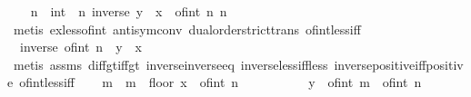 \begin{isabellebody}
\ \ \isamarkupfalse%
\ n\ {\isacharcolon}{\kern0pt}{\isacharcolon}{\kern0pt}\ int\ \ n{\isacharcolon}{\kern0pt}\ {\isachardoublequoteopen}inverse\ {\isacharparenleft}{\kern0pt}y\ {\isacharminus}{\kern0pt}\ x{\isacharparenright}{\kern0pt}\ {\isacharless}{\kern0pt}\ of{\isacharunderscore}{\kern0pt}int\ n{\isachardoublequoteclose}\ {\isachardoublequoteopen}n\ {\isachargreater}{\kern0pt}\ {}{\isachardoublequoteclose}\ \isamarkupfalse%
\ {\isacharparenleft}{\kern0pt}metis\ ex{\isacharunderscore}{\kern0pt}less{\isacharunderscore}{\kern0pt}of{\isacharunderscore}{\kern0pt}int\ antisym{\isacharunderscore}{\kern0pt}conv{}\ dual{\isacharunderscore}{\kern0pt}order{\isachardot}{\kern0pt}strict{\isacharunderscore}{\kern0pt}trans\ of{\isacharunderscore}{\kern0pt}int{\isacharunderscore}{\kern0pt}less{\isacharunderscore}{\kern0pt}iff{\isacharparenright}{\kern0pt}\isanewline
\ \ \isamarkupfalse%
\ {\isacharasterisk}{\kern0pt}{\isacharcolon}{\kern0pt}\ {\isachardoublequoteopen}inverse\ {\isacharparenleft}{\kern0pt}of{\isacharunderscore}{\kern0pt}int\ n{\isacharparenright}{\kern0pt}\ {\isacharless}{\kern0pt}\ y\ {\isacharminus}{\kern0pt}\ x{\isachardoublequoteclose}\ \isamarkupfalse%
\ {\isacharparenleft}{\kern0pt}metis\ assms\ diff{\isacharunderscore}{\kern0pt}gt{\isacharunderscore}{\kern0pt}{}{\isacharunderscore}{\kern0pt}iff{\isacharunderscore}{\kern0pt}gt\ inverse{\isacharunderscore}{\kern0pt}inverse{\isacharunderscore}{\kern0pt}eq\ inverse{\isacharunderscore}{\kern0pt}less{\isacharunderscore}{\kern0pt}iff{\isacharunderscore}{\kern0pt}less\ inverse{\isacharunderscore}{\kern0pt}positive{\isacharunderscore}{\kern0pt}iff{\isacharunderscore}{\kern0pt}positive\ of{\isacharunderscore}{\kern0pt}int{\isacharunderscore}{\kern0pt}{}{\isacharunderscore}{\kern0pt}less{\isacharunderscore}{\kern0pt}iff{\isacharparenright}{\kern0pt}\isanewline
\ \ \isamarkupfalse%
\ m\ \ {\isachardoublequoteopen}m\ {\isacharequal}{\kern0pt}\ floor\ {\isacharparenleft}{\kern0pt}x\ {\isacharasterisk}{\kern0pt}\ of{\isacharunderscore}{\kern0pt}int\ n{\isacharparenright}{\kern0pt}\ {\isacharplus}{\kern0pt}\ {}{\isachardoublequoteclose}\isanewline
\ \ \isacommand{{\isacharbraceleft}{\kern0pt}}\isamarkupfalse%
\isanewline
\ \ \ \ \isamarkupfalse%
\ {\isachardoublequoteopen}y\ {\isasymle}\ of{\isacharunderscore}{\kern0pt}int\ m\ {\isacharslash}{\kern0pt}\ of{\isacharunderscore}{\kern0pt}int\ n{\isachardoublequoteclose}\isanewline

\end{isabellebody}
